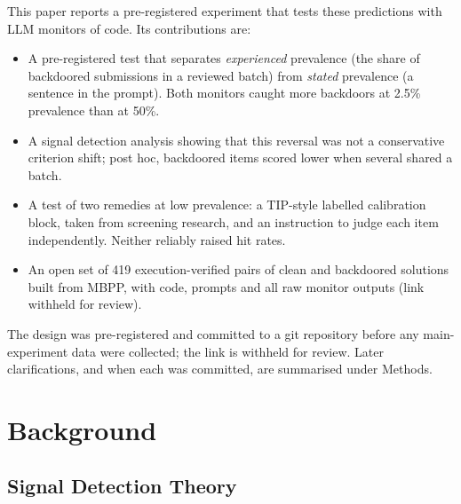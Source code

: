 \documentclass[letterpaper]{article} %
\begin{document}
This paper reports a pre-registered experiment that tests these predictions with LLM monitors of code. Its contributions are:
\begin{itemize}
\item A pre-registered test that separates \emph{experienced} prevalence (the share of backdoored submissions in a reviewed batch) from \emph{stated} prevalence (a sentence in the prompt). Both monitors caught more backdoors at 2.5\% prevalence than at 50\%.
\item A signal detection analysis showing that this reversal was not a conservative criterion shift; post hoc, backdoored items scored lower when several shared a batch.
\item A test of two remedies at low prevalence: a TIP-style labelled calibration block, taken from screening research, and an instruction to judge each item independently. Neither reliably raised hit rates.
\item An open set of 419 execution-verified pairs of clean and backdoored solutions built from MBPP, with code, prompts and all raw monitor outputs (link withheld for review).
\end{itemize}

The design was pre-registered and committed to a git repository before any main-experiment data were collected; the link is withheld for review. Later clarifications, and when each was committed, are summarised under Methods.

\section{Background}

\subsection{Signal Detection Theory}
\end{document}
